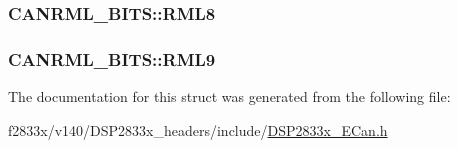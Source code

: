 \subsubsection[{R\+M\+L8}]{ C\+A\+N\+R\+M\+L\+\_\+\+B\+I\+T\+S\+::\+R\+M\+L8}\label{struct_c_a_n_r_m_l___b_i_t_s_a208900c3a6e1cbacebf714df8b6f1ba3}
\hypertarget{struct_c_a_n_r_m_l___b_i_t_s_ab11c7f89cd257cab2d22c4acf175cfb3}{}
\subsubsection[{R\+M\+L9}]{ C\+A\+N\+R\+M\+L\+\_\+\+B\+I\+T\+S\+::\+R\+M\+L9}\label{struct_c_a_n_r_m_l___b_i_t_s_ab11c7f89cd257cab2d22c4acf175cfb3}


The documentation for this struct was generated from the following file\+:\begin{DoxyCompactItemize}
\item 
f2833x/v140/\+D\+S\+P2833x\+\_\+headers/include/\hyperlink{_d_s_p2833x___e_can_8h}{D\+S\+P2833x\+\_\+\+E\+Can.\+h}\end{DoxyCompactItemize}
